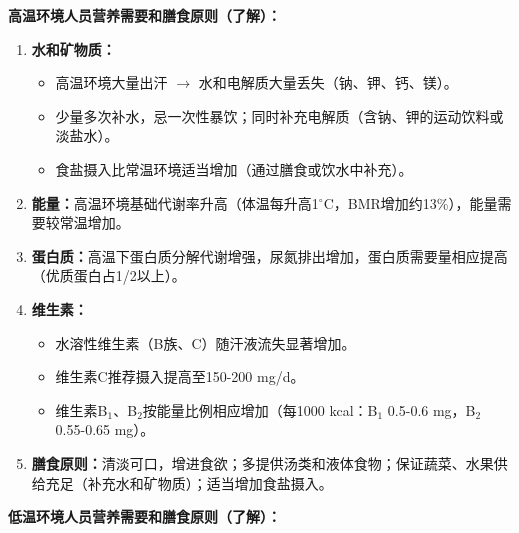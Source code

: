 \begin{tipbox}
\textbf{高温环境人员营养需要和膳食原则（了解）：}

\begin{enumerate}[leftmargin=*]
    \item \textbf{水和矿物质：}
    \begin{itemize}[leftmargin=*]
        \item 高温环境大量出汗 $\rightarrow$ 水和电解质大量丢失（钠、钾、钙、镁）。
        \item 少量多次补水，忌一次性暴饮；同时补充电解质（含钠、钾的运动饮料或淡盐水）。
        \item 食盐摄入比常温环境适当增加（通过膳食或饮水中补充）。
    \end{itemize}

    \item \textbf{能量：}高温环境基础代谢率升高（体温每升高1$^\circ$C，BMR增加约13\%），能量需要较常温增加。
    \item \textbf{蛋白质：}高温下蛋白质分解代谢增强，尿氮排出增加，蛋白质需要量相应提高（优质蛋白占1/2以上）。
    \item \textbf{维生素：}
    \begin{itemize}[leftmargin=*]
        \item 水溶性维生素（B族、C）随汗液流失显著增加。
        \item 维生素C推荐摄入提高至150-200 mg/d。
        \item 维生素B$_{1}$、B$_{2}$按能量比例相应增加（每1000 kcal：B$_{1}$ 0.5-0.6 mg，B$_{2}$ 0.55-0.65 mg）。
    \end{itemize}
    \item \textbf{膳食原则：}清淡可口，增进食欲；多提供汤类和液体食物；保证蔬菜、水果供给充足（补充水和矿物质）；适当增加食盐摄入。
\end{enumerate}

\textbf{低温环境人员营养需要和膳食原则（了解）：}


\end{tipbox}
